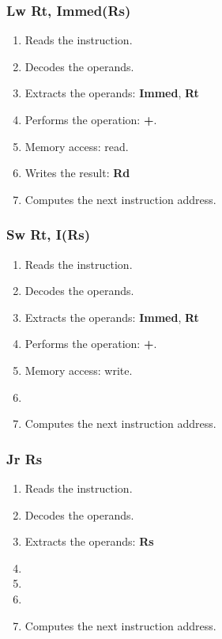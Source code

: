 
\begin{frame}
  \frametitle{Lw Rt, Immed(Rs)}

  \begin{enumerate}[<+->]
    \item
      Reads the instruction.
    \item
      Decodes the operands.
    \item
      Extracts the operands: \textbf{Immed}, \textbf{Rt}
    \item
      Performs the operation: \textbf{+}.
    \item
      Memory access: read.
    \item
      Writes the result: \textbf{Rd}
    \item
      Computes the next instruction address.
  \end{enumerate}
\end{frame}


\begin{frame}
  \frametitle{Sw Rt, I(Rs)}

  \begin{enumerate}[<+->]
    \item
      Reads the instruction.
    \item
      Decodes the operands.
    \item
      Extracts the operands: \textbf{Immed}, \textbf{Rt}
    \item
      Performs the operation: \textbf{+}.
    \item
      Memory access: write.
    \item

    \item
      Computes the next instruction address.
  \end{enumerate}
\end{frame}


\begin{frame}
  \frametitle{Jr Rs}

  \begin{enumerate}[<+->]
    \item
      Reads the instruction.
    \item
      Decodes the operands.
    \item
      Extracts the operands: \textbf{Rs}
    \item

    \item
      
    \item

    \item
      Computes the next instruction address.
  \end{enumerate}
\end{frame}

